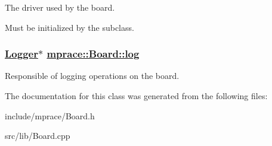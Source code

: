 The driver used by the board. 

Must be initialized by the subclass.\hypertarget{classmprace_1_1Board_p0}{
\subsubsection[log]{\setlength{\rightskip}{0pt plus 5cm}\hyperlink{classmprace_1_1Logger}{Logger}$\ast$ \hyperlink{classmprace_1_1Board_p0}{mprace::Board::log}}}
\label{classmprace_1_1Board_p0}


Responsible of logging operations on the board. 



The documentation for this class was generated from the following files:\begin{CompactItemize}
\item 
include/mprace/Board.h\item 
src/lib/Board.cpp\end{CompactItemize}
